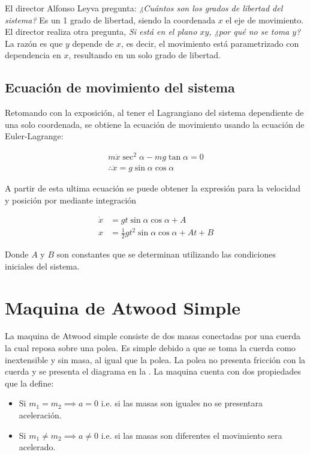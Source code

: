 \documentclass{article}
\theoremstyle{definition}
\begin{document}
	El director Alfonso Leyva pregunta: \emph{¿Cuántos son los grados de libertad del sistema?} Es un 1 grado de libertad, siendo la coordenada $x$ el eje de movimiento. El director realiza otra pregunta, \emph{Si está en el plano $xy$, ¿por qué no se toma $y$?} La razón es que $y$ depende de $x$, es decir, el movimiento está parametrizado con dependencia en $x$, resultando en un solo grado de libertad.

\subsection{Ecuación de movimiento del sistema}
Retomando con la exposición, al tener el Lagrangiano del sistema dependiente de una solo coordenada, se obtiene la ecuación de movimiento usando la ecuación de Euler-Lagrange:

\begin{gather}
	m\ddot{x}\sec^2{\alpha} - mg\tan{\alpha} = 0 \\
	\therefore \ddot{x} = g\sin{\alpha}\cos{\alpha}
\end{gather}

A partir de esta ultima ecuación se puede obtener la expresión para la velocidad y posición por mediante integración

\begin{align}
	\dot{x} &= gt\sin{\alpha}\cos{\alpha} + A \\
	x       &= \frac{1}{2} gt^{2} \sin{\alpha}\cos{\alpha} + At + B
\end{align}

Donde $A$ y $B$ son constantes que se determinan utilizando las condiciones iniciales del sistema.

\section{Maquina de Atwood Simple}
La maquina de Atwood simple consiste de dos masas conectadas por una cuerda la cual reposa sobre una polea. Es simple debido a que se toma la cuerda como inextensible y sin masa, al igual que la polea. La polea no presenta fricción con la cuerda y se presenta el diagrama en la . La maquina cuenta con dos propiedades que la define:

\begin{itemize}
	\item Si $m_1 = m_2 \implies a = 0$ i.e. si las masas son iguales no se presentara aceleración.
	\item Si $m_1 \ne m_2 \implies a \ne 0$ i.e. si las masas son diferentes el movimiento sera acelerado.
\end{itemize}
\end{document}
